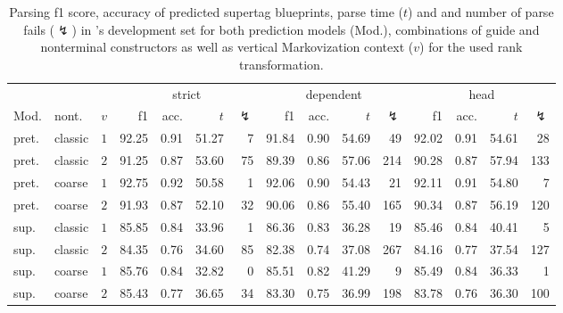 \documentclass[../../document.tex]{subfiles}
\begin{document}
    \begin{table}
        \caption{\label{tbl:experiments:tiger}
        Parsing f1 score, accuracy of predicted supertag blueprints, parse time ($t$) and and number of parse fails ($\lightning$) in \tiger{}'s development set for both prediction models (Mod.), combinations of guide and nonterminal constructors as well as vertical Markovization context ($v$) for the used rank transformation.
        }
        \centering
        \setlength{\tabcolsep}{4pt}
        \vspace{.2cm}
        \begin{tabular}{llc|rrrr|rrrr|rrrr}
            \toprule
         &    &        & \multicolumn{4}{c|}{strict} & \multicolumn{4}{c|}{dependent} & \multicolumn{4}{c}{head}  \\
    Mod. & nont.   &\(v\)   & f1 & acc. & $t$ & $\lightning$ & f1 & acc. & $t$ & $\lightning$ & f1 & acc. & $t$ & $\lightning$ \\ \hline
    pret. & classic & \(1\)  & 92.25 & 0.91 & 51.27 & 7 & 91.84 & 0.90 & 54.69 & 49 & 92.02 & 0.91 & 54.61 & 28 \\
    pret. & classic & \(2\)  & 91.25 & 0.87 & 53.60 & 75 & 89.39 & 0.86 & 57.06 & 214 & 90.28 & 0.87 & 57.94 & 133 \\
    pret. & coarse  & \(1\)  & 92.75 & 0.92 & 50.58 & 1 & 92.06 & 0.90 & 54.43 & 21 & 92.11 & 0.91 & 54.80 & 7 \\
    pret. & coarse  & \(2\)  & 91.93 & 0.87 & 52.10 & 32 & 90.06 & 0.86 & 55.40 & 165 & 90.34 & 0.87 & 56.19 & 120 \\
    \midrule
    sup. & classic & \(1\)  & 85.85 & 0.84 & 33.96 & 1 & 86.36 & 0.83 & 36.28 & 19 & 85.46 & 0.84 & 40.41 & 5 \\
    sup. & classic & \(2\)  & 84.35 & 0.76 & 34.60 & 85 & 82.38 & 0.74 & 37.08 & 267 & 84.16 & 0.77 & 37.54 & 127 \\
    sup. & coarse  & \(1\)  & 85.76 & 0.84 & 32.82 & 0 & 85.51 & 0.82 & 41.29 & 9 & 85.49 & 0.84 & 36.33 & 1 \\
    sup. & coarse  & \(2\)  & 85.43 & 0.77 & 36.65 & 34 & 83.30 & 0.75 & 36.99 & 198 & 83.78 & 0.76 & 36.30 & 100 \\
    \bottomrule
        \end{tabular}
    \end{table}
\end{document}
